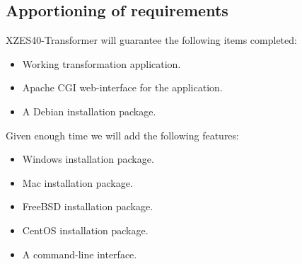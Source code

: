 
\subsection{Apportioning of requirements}

XZES40-Transformer will guarantee the following items completed:

\begin{itemize}
  \item Working transformation application.
  \item Apache CGI web-interface for the application.
  \item A Debian installation package.
\end{itemize}

Given enough time we will add the following features:

\begin{itemize}
  \item Windows installation package.
  \item Mac installation package.
  \item FreeBSD installation package.
  \item CentOS installation package.
  \item A command-line interface.
\end{itemize}
